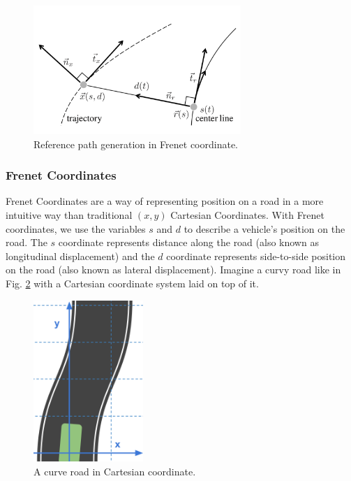 \begin{figure}[h]
\centering
\includegraphics[width=0.7\textwidth]{figs/ch3/traj-generation}
\caption{Reference path generation in Frenet coordinate.}
\label{fig:traj-generation}
\end{figure}

\subsubsection{Frenet Coordinates}


Frenet Coordinates are a way of representing position on a road in a more intuitive way than traditional $(x,y)$ Cartesian Coordinates. With Frenet coordinates, we use the variables $s$ and $d$ to describe a vehicle's position on the road. The $s$ coordinate represents distance along the road (also known as longitudinal displacement) and the $d$ coordinate represents side-to-side position on the road (also known as lateral displacement). Imagine a curvy road like in Fig. \ref{fig:curve-in-cartesian} with a Cartesian coordinate system laid on top of it.

\begin{figure}[h]
\centering
\includegraphics[height=2.4in]{figs/ch3/curve-in-cartesian}
\caption{A curve road in Cartesian coordinate.}
\label{fig:curve-in-cartesian}
\end{figure}

